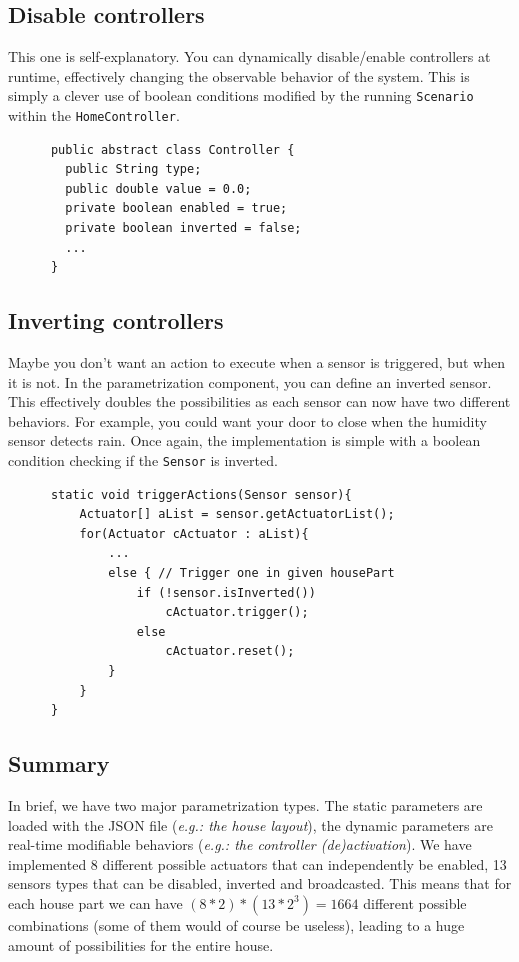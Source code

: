     \subsection{Disable controllers}
      This one is self-explanatory. You can dynamically disable/enable controllers at runtime, effectively changing the observable behavior of the system. This is simply a clever use of boolean conditions modified by the running \texttt{Scenario} within the \texttt{HomeController}.
      \begin{verbatim}
      public abstract class Controller {
        public String type;
        public double value = 0.0;
        private boolean enabled = true;
        private boolean inverted = false;
        ...
      }
      \end{verbatim}

    \subsection{Inverting controllers}
      Maybe you don't want an action to execute when a sensor is triggered, but when it is not. In the parametrization component, you can define an inverted sensor. This effectively doubles the possibilities as each sensor can now have two different behaviors. For example, you could want your door to close when the humidity sensor detects rain. Once again, the implementation is simple with a boolean condition checking if the \texttt{Sensor} is inverted.
      \begin{verbatim}
      static void triggerActions(Sensor sensor){
          Actuator[] aList = sensor.getActuatorList();
          for(Actuator cActuator : aList){
              ...
              else { // Trigger one in given housePart
                  if (!sensor.isInverted())
                      cActuator.trigger();
                  else
                      cActuator.reset();
              }
          }
      }
      \end{verbatim}

    \subsection{Summary}
      In brief, we have two major parametrization types. The static parameters are loaded with the JSON file (\emph{e.g.: the house layout}), the dynamic parameters are real-time modifiable behaviors (\emph{e.g.: the controller (de)activation}).
      We have implemented 8 different possible actuators that can independently be enabled, 13 sensors types that can be disabled, inverted and broadcasted. This means that for each house part we can have $(8*2)*(13*2^3)=1664$ different possible combinations (some of them would of course be useless), leading to a huge amount of possibilities for the entire house.
      
